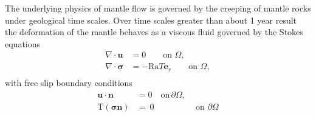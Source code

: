 \documentclass[12pt]{article}
\newcommand{\uu}{{\ensuremath{\boldsymbol{u}}}}
\newcommand{\ssigma}{{\ensuremath{\boldsymbol{\sigma}}}}
\begin{document}
The underlying physics of mantle flow is governed by the creeping of mantle rocks under geological time scales. 
Over time scales greater than about 1 year result the deformation of the mantle behaves as a viscous fluid governed by the Stokes equations
\begin{equation}
  \label{eq:stokes}
  \begin{split}
    \nabla \cdot \uu &=0 \qquad  \text{on } \Omega, \\
    \nabla \cdot \ssigma&=-\text{Ra}T \textbf{e}_r  \qquad \text{on } \Omega, \\
  \end{split}
\end{equation}
with free slip boundary conditions
\begin{align*}
  \uu\cdot \textbf{n}&=0 \quad \text{on} \, \partial \Omega, \\
 \boldsymbol{\mathrm{T}}(\ssigma \textbf{n})
  &= \:0 & \text{ on }\partial \Omega
  \label{eq:bc}
\end{align*}
\end{document}
